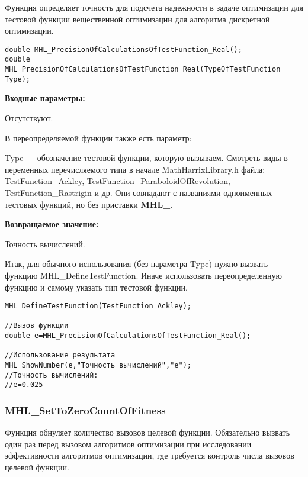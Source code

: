 \documentclass[a4paper,12pt]{article}
\begin{document}
Функция определяет точность для подсчета надежности в задаче оптимизации для тестовой функции вещественной оптимизации для алгоритма дискретной оптимизации.


\begin{lstlisting}[label=code_syntax_MHL_PrecisionOfCalculationsOfTestFunction_Real,caption=Синтаксис]
double MHL_PrecisionOfCalculationsOfTestFunction_Real();
double MHL_PrecisionOfCalculationsOfTestFunction_Real(TypeOfTestFunction Type);
\end{lstlisting}

\textbf{Входные параметры:}

Отсутствуют.

В переопределяемой функции также есть параметр:
  
Type --- обозначение тестовой функции, которую вызываем.
Смотреть виды в переменных перечисляемого типа в начале MathHarrixLibrary.h файла: TestFunction\_Ackley, TestFunction\_ParaboloidOfRevolution, TestFunction\_Rastrigin и др. Они совпадают с названиями одноименных тестовых функций, но без приставки \textbf{MHL\_}.

\textbf{Возвращаемое значение:}
 
Точность вычислений.

Итак, для обычного использования (без параметра Type) нужно вызвать функцию MHL\_DefineTestFunction. Иначе использовать переопределенную функцию и самому указать тип тестовой функции.


\begin{lstlisting}[label=code_use_MHL_PrecisionOfCalculationsOfTestFunction_Real,caption=Пример использования]
MHL_DefineTestFunction(TestFunction_Ackley);

//Вызов функции
double e=MHL_PrecisionOfCalculationsOfTestFunction_Real();

//Использование результата
MHL_ShowNumber(e,"Точность вычислений","e");
//Точность вычислений:
//e=0.025
\end{lstlisting}

\subsubsection{MHL\_SetToZeroCountOfFitness}\label{MHL_SetToZeroCountOfFitness}

Функция обнуляет количество вызовов целевой функции. Обязательно вызвать один раз перед вызовом алгоритмов оптимизации при исследовании эффективности    алгоритмов оптимизации, где требуется контроль числа вызовов целевой функции.
\end{document}
